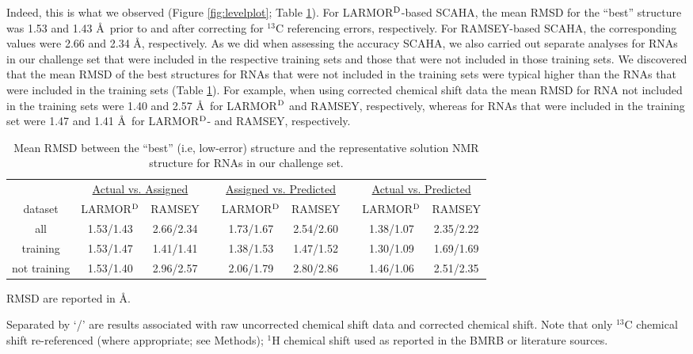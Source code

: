 \documentclass[journal=jcisd8,manuscript=article,layout=onecolumn]{achemso}
\begin{document}
{Indeed, this is what we observed (Figure \ref{fig:levelplot}; Table \ref{tab:meanrsmd}). For LARMOR$^{\rm D}$-based SCAHA, the mean RMSD for the ``best'' structure was 1.53 and 1.43 \AA\  prior to and after correcting for $^{13}$C referencing errors, respectively. For  RAMSEY-based SCAHA, the corresponding values were 2.66 and 2.34 \AA, respectively. As we did when assessing the accuracy SCAHA, we also carried out separate analyses for RNAs in our challenge set that were included in the respective training sets and those that were not included in those training sets. We discovered that the mean RMSD of the best structures for RNAs that were not included in the training sets were typical higher than the RNAs that were included in the training sets (Table \ref{tab:meanrsmd}).  For example, when using corrected chemical shift data the mean RMSD for RNA not included in the training sets were 1.40 and 2.57 \AA\ for LARMOR$^{\rm D}$ and RAMSEY, respectively, whereas for RNAs that were included in the training set were 1.47 and 1.41 \AA\ for LARMOR$^{\rm D}$- and RAMSEY, respectively.
\begin{table}[h!]
\centering
\caption{Mean RMSD between the ``best'' (i.e, low-error) structure and the representative solution NMR structure for RNAs in our challenge set.}
\begin{threeparttable}
\begin{tabular}{*9c}
\toprule
{} & \multicolumn{2}{c}{\underline{Actual vs. Assigned}} & {} & \multicolumn{2}{c}{\underline{Assigned vs. Predicted}} & {} & \multicolumn{2}{c}{\underline{Actual vs. Predicted}} \\
dataset & LARMOR$^{\rm D}$   & RAMSEY   & {} & LARMOR$^{\rm D}$  & RAMSEY   & {} & LARMOR$^{\rm D}$    & RAMSEY \\

\hline
all & 1.53/1.43 & 2.66/2.34 & {} & 1.73/1.67 & 2.54/2.60 & {} &  1.38/1.07 & 2.35/2.22 \\
training & 1.53/1.47 & 1.41/1.41 & {} & 1.38/1.53 & 1.47/1.52 & {} &  1.30/1.09 & 1.69/1.69 \\
not training & 1.53/1.40 & 2.96/2.57 & {} & 2.06/1.79 & 2.80/2.86 & {} &  1.46/1.06 & 2.51/2.35 \\
\hline
\end{tabular}
\begin{tablenotes}
\item[1] RMSD are reported in \AA.
\item[2] Separated by `/' are  results associated with raw uncorrected chemical shift data and corrected chemical shift. Note that only $^{13}$C chemical shift re-referenced (where appropriate; see Methods); $^{1}$H chemical shift used as reported in the BMRB or literature sources.  
\end{tablenotes}
\end{threeparttable}
\label{tab:meanrsmd} 
\end{table}


}
\end{document}
